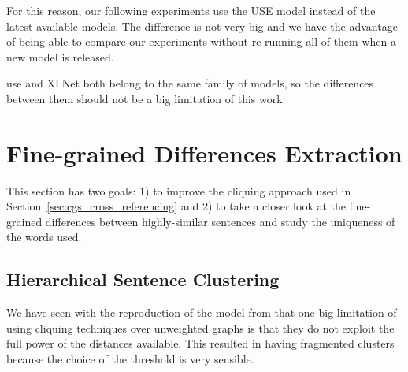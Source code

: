 For this reason, our following experiments use the USE model instead of the latest available models. The difference is not very big and we have the advantage of being able to compare our experiments without re-running all of them when a new model is released.

\acrshort{use} and XLNet both belong to the same family of models, so the differences between them should not be a big limitation of this work.




\section{\statusgreen Fine-grained Differences Extraction}
\label{sec:cgs_clustering_and_differences}

This section has two goals: 1) to improve the cliquing approach used in Section~\ref{sec:cgs_cross_referencing} and 2) to take a closer look at the fine-grained differences between highly-similar sentences and study the uniqueness of the words used.


\subsection{\statusgreen Hierarchical Sentence Clustering}
\label{sec:cgs_clustering_and_differences_hierarchical}


We have seen with the reproduction of the model from \citet{bountouridis2018explaining} that one big limitation of using cliquing techniques over unweighted graphs is that they do not exploit the full power of the distances available. This resulted in having fragmented clusters because the choice of the threshold is very sensible.

